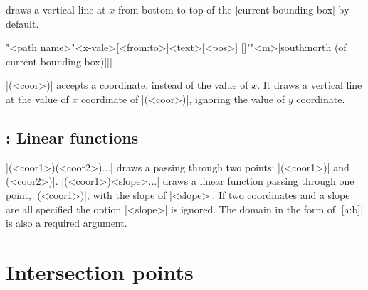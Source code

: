 \icmd{\tzvfnat} draws a vertical line at $x$ from bottom to top of the |current bounding box| by default.

\begin{tzdef}
\tzvfnat[<opt>]"<path name>"{<x-vale>}[<from:to>]{<text>}[<pos>]
  []""{<m>}[south:north (of current bounding box)]{}[]
\end{tzdef}

\icmd{\tzvfn}|(<coor>)| accepts a coordinate, instead of the value of $x$. It draws a vertical line at the value of $x$ coordinate of |(<coor>)|, ignoring the value of $y$ coordinate.

\begin{tzcode}{.3}
\end{tzcode}



\subsection{\protect\cmd{\tzLFn}: Linear functions}
\label{ssi:tzLFn}

\icmd{\tzLFn}|(<coor1>)(<coor2>)...| draws a  passing through two points: |(<coor1>)| and |(<coor2>)|.
|\tzLFn(<coor1>){<slope>}...| draws a linear function passing through one point, |(<coor1>)|,  with the slope of |<slope>|. If two coordinates and a slope are all specified the option |{<slope>}| is ignored. The domain in the form of |[a:b]| is also a required argument.

\begin{tzcode}{.3}
\end{tzcode}



\section{Intersection points}
\label{si:intersections}

